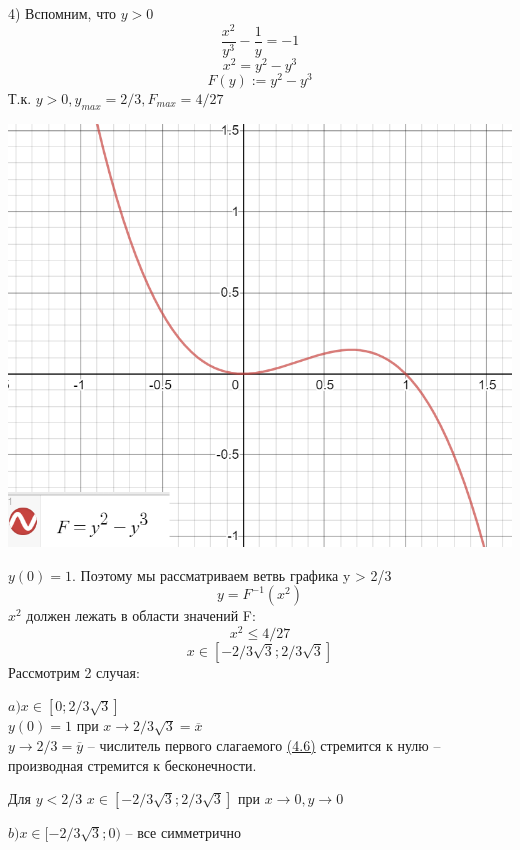 \documentclass[10pt]{report}
\begin{document}
4) Вспомним, что $y> 0$
\[ \frac {x^2} {y^3}-\frac {1} {y} = -1\]
\[x^2=y^2-y^3\]
\[F(y):=y^2-y^3\]
Т.к. $ y > 0, y_{max}= 2/3, F_{max}=4/27$
\begin{center}
{\includegraphics[scale=0.4]{graph4.5.png}} 
\end{center}
$y(0) = 1$. Поэтому мы рассматриваем ветвь графика y > 2/3
\[y = F^{-1} (x^2)\]
$x^2$ должен лежать в области значений F:
\[
x^2 \leq 4/27\]
\[ x \in [-2/3\sqrt{3};2/3\sqrt{3}]\]
Рассмотрим 2 случая:

$a) x\in [0; 2/3\sqrt{3}]$\\
$y(0)=1$ при $ x \rightarrow2/3\sqrt{3} = \overline{x}$\\
$y \rightarrow 2/3 = \overline{y}$ -- числитель первого слагаемого \hyperlink {4.6}{(4.6)} стремится к нулю -- производная стремится к бесконечности. 

Для $y<2/3$ $ x \in [-2/3\sqrt{3};2/3\sqrt{3}] $
при $x \rightarrow 0, y \rightarrow 0$

$b) x\in [-2/3\sqrt{3}; 0)$ -- все симметрично
\end{document}
